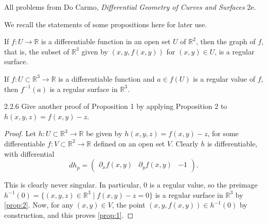 \documentclass[11pt]{article}
\begin{document}
All problems from Do Carmo, \textit{Differential Geometry of Curves and Surfaces} 2e.

We recall the statements of some propositions here for later use.

\begin{prop}
	\label{prop:1}
	If \( f: U \rightarrow \mathbb{R} \) is a differentiable function in an open set \( U \) of \( \mathbb{R}^2 \), then the graph of \( f \), that is, the subset of \( \mathbb{R}^3 \) given by \( (x,y, f(x,y)) \) for \( (x,y) \in U \), is a regular surface.
\end{prop}

\begin{prop}
	\label{prop:2}
	If \( f: U \subset \mathbb{R}^3 \rightarrow \mathbb{R} \) is a differentiable function and \( a \in f(U) \) is a regular value of \( f \), then \( f^{-1}(a) \) is a regular surface in \( \mathbb{R}^3 \).
\end{prop}

\begin{problem}{2.2.6}
	Give another proof of Proposition 1 by applying Proposition 2 to \( h(x,y,z) = f(x,y) - z \).
\end{problem}
\begin{proof}
	Let \( h: U \subset \mathbb{R}^3 \rightarrow \mathbb{R} \) be given by \( h(x,y,z) = f(x,y) - z \), for some differentiable \( f: V \subset \mathbb{R}^2 \rightarrow \mathbb{R} \) defined on an open set \( V \).
	Clearly \( h \) is differentiable, with differential
	\begin{equation}
		\label{eq:6}
		dh_{p} = \begin{pmatrix}
			\partial_xf(x,y) & \partial_yf(x,y) & -1
		\end{pmatrix}.
	\end{equation}

	This is clearly never singular.
	In particular, \( 0 \) is a regular value, so the preimage \( h^{-1}(0) = \{(x,y,z) \in \mathbb{R}^3 \mid f(x,y) - z = 0\}\) is a regular surface in \( \mathbb{R}^3 \) by \cref{prop:2}.
	Now, for any \( (x,y) \in V \), the point \( (x,y, f(x,y)) \in h^{-1}(0) \) by construction, and this proves \cref{prop:1}.
\end{proof}
\end{document}
